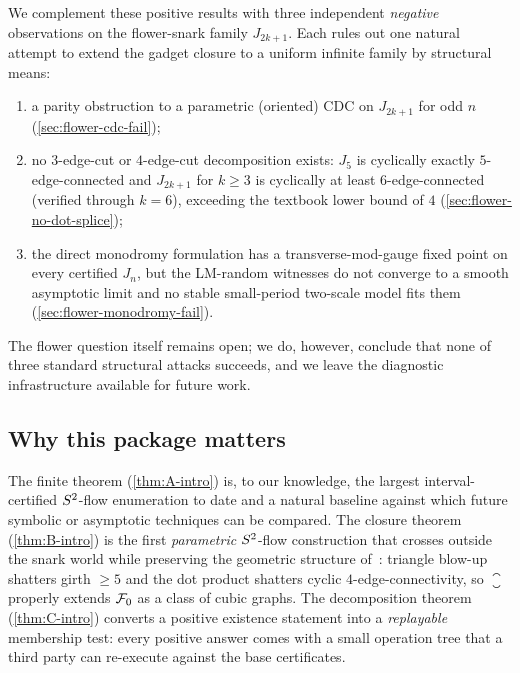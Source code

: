 We complement these positive results with three independent
\emph{negative} observations on the flower-snark family $J_{2k+1}$.
Each rules out one natural attempt to extend the gadget closure to a
uniform infinite family by structural means:
\begin{enumerate}[label=(\roman*)]
  \item a parity obstruction to a parametric (oriented) CDC on
        $J_{2k+1}$ for odd $n$ (\cref{sec:flower-cdc-fail});
  \item no $3$-edge-cut or $4$-edge-cut decomposition exists: $J_5$
        is cyclically exactly $5$-edge-connected and $J_{2k+1}$ for
        $k \ge 3$ is cyclically at least $6$-edge-connected (verified
        through $k = 6$), exceeding the textbook lower bound of $4$
        (\cref{sec:flower-no-dot-splice});
  \item the direct monodromy formulation has a transverse-mod-gauge
        fixed point on every certified $J_n$, but the LM-random
        witnesses do not converge to a smooth asymptotic limit and no
        stable small-period two-scale model fits them
        (\cref{sec:flower-monodromy-fail}).
\end{enumerate}

The flower question itself remains open; we do, however, conclude
that none of three standard structural attacks succeeds, and we leave
the diagnostic infrastructure available for future work.

\subsection{Why this package matters}
\label{sec:intro-why}

The finite theorem (\cref{thm:A-intro}) is, to our knowledge, the
largest interval-certified $S^{2}$-flow enumeration to date and a
natural baseline against which future symbolic or asymptotic
techniques can be compared. The closure theorem
(\cref{thm:B-intro}) is the first \emph{parametric} $S^{2}$-flow
construction that crosses outside the snark world while preserving
the geometric structure of~\cite{HMM26}: triangle blow-up shatters
girth $\ge 5$ and the dot product shatters cyclic $4$-edge-connectivity,
so $\closure$ properly extends $\mathcal{F}_0$ as a class of cubic graphs.
The decomposition theorem (\cref{thm:C-intro}) converts a positive
existence statement into a \emph{replayable} membership test: every
positive answer comes with a small operation tree that a third party
can re-execute against the base certificates.

